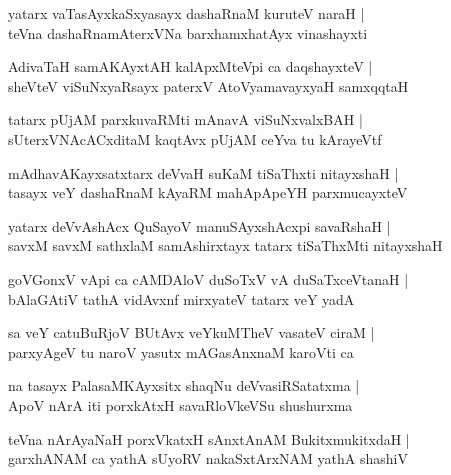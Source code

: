 \documentclass[twoside,12pt,openright]{book}
\newcounter{shloka}[chapter]
\begin{document}
\begin{shloka}%
yatarx vaTasAyxkaSxyasayx dashaRnaM kuruteV naraH |\\
teVna dashaRnamAterxVNa barxhamxhatAyx vinashayxti
\end{shloka}

\begin{shloka}%
AdivaTaH samAKAyxtAH kalApxMteVpi ca daqshayxteV |\\
sheVteV viSuNxyaRsayx paterxV AtoVyamavayxyaH samxqqtaH 
\end{shloka}

\begin{shloka}%
tatarx pUjAM parxkuvaRMti mAnavA viSuNxvalxBAH |\\
sUterxVNAcACxditaM kaqtAvx pUjAM ceYva tu kArayeVtf
\end{shloka}

\begin{shloka}%
mAdhavAKayxsatxtarx deVvaH suKaM tiSaThxti nitayxshaH |\\
tasayx veY dashaRnaM kAyaRM mahApApeYH parxmucayxteV 
\end{shloka}

\begin{shloka}%
yatarx deVvAshAcx QuSayoV manuSAyxshAcxpi savaRshaH |\\
savxM savxM sathxlaM samAshirxtayx tatarx tiSaThxMti nitayxshaH
\end{shloka}

\begin{shloka}%
goVGonxV vApi ca cAMDAloV duSoTxV vA duSaTxceVtanaH |\\
bAlaGAtiV tathA vidAvxnf mirxyateV tatarx veY yadA
\end{shloka}

\begin{shloka}%
sa veY catuBuRjoV BUtAvx veYkuMTheV vasateV ciraM |\\
parxyAgeV tu naroV yasutx mAGasAnxnaM karoVti ca 
\end{shloka}

\begin{shloka}%
na tasayx PalasaMKAyxsitx shaqNu deVvasiRSatatxma |\\
ApoV nArA iti porxkAtxH savaRloVkeVSu shushurxma
\end{shloka}

\begin{shloka}%
teVna nArAyaNaH porxVkatxH sAnxtAnAM BukitxmukitxdaH |\\
garxhANAM ca yathA sUyoRV nakaSxtArxNAM yathA shashiV
\end{shloka}
\end{document}
